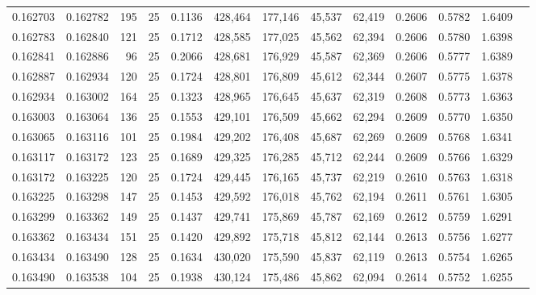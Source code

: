 \begin{tabular}{rrrrrrrrrrrrr}
0.162703 & 0.162782 &   195 &  25 &                                     0.1136 & 428,464 & 177,146 &  45,537 &  62,419 & 0.2606 & 0.5782 & 1.6409 \\
0.162783 & 0.162840 &   121 &  25 &                                     0.1712 & 428,585 & 177,025 &  45,562 &  62,394 & 0.2606 & 0.5780 & 1.6398 \\
0.162841 & 0.162886 &    96 &  25 &                                     0.2066 & 428,681 & 176,929 &  45,587 &  62,369 & 0.2606 & 0.5777 & 1.6389 \\
0.162887 & 0.162934 &   120 &  25 &                                     0.1724 & 428,801 & 176,809 &  45,612 &  62,344 & 0.2607 & 0.5775 & 1.6378 \\
0.162934 & 0.163002 &   164 &  25 &                                     0.1323 & 428,965 & 176,645 &  45,637 &  62,319 & 0.2608 & 0.5773 & 1.6363 \\
0.163003 & 0.163064 &   136 &  25 &                                     0.1553 & 429,101 & 176,509 &  45,662 &  62,294 & 0.2609 & 0.5770 & 1.6350 \\
0.163065 & 0.163116 &   101 &  25 &                                     0.1984 & 429,202 & 176,408 &  45,687 &  62,269 & 0.2609 & 0.5768 & 1.6341 \\
0.163117 & 0.163172 &   123 &  25 &                                     0.1689 & 429,325 & 176,285 &  45,712 &  62,244 & 0.2609 & 0.5766 & 1.6329 \\
0.163172 & 0.163225 &   120 &  25 &                                     0.1724 & 429,445 & 176,165 &  45,737 &  62,219 & 0.2610 & 0.5763 & 1.6318 \\
0.163225 & 0.163298 &   147 &  25 &                                     0.1453 & 429,592 & 176,018 &  45,762 &  62,194 & 0.2611 & 0.5761 & 1.6305 \\
0.163299 & 0.163362 &   149 &  25 &                                     0.1437 & 429,741 & 175,869 &  45,787 &  62,169 & 0.2612 & 0.5759 & 1.6291 \\
0.163362 & 0.163434 &   151 &  25 &                                     0.1420 & 429,892 & 175,718 &  45,812 &  62,144 & 0.2613 & 0.5756 & 1.6277 \\
0.163434 & 0.163490 &   128 &  25 &                                     0.1634 & 430,020 & 175,590 &  45,837 &  62,119 & 0.2613 & 0.5754 & 1.6265 \\
0.163490 & 0.163538 &   104 &  25 &                                     0.1938 & 430,124 & 175,486 &  45,862 &  62,094 & 0.2614 & 0.5752 & 1.6255 \\

\end{tabular}
